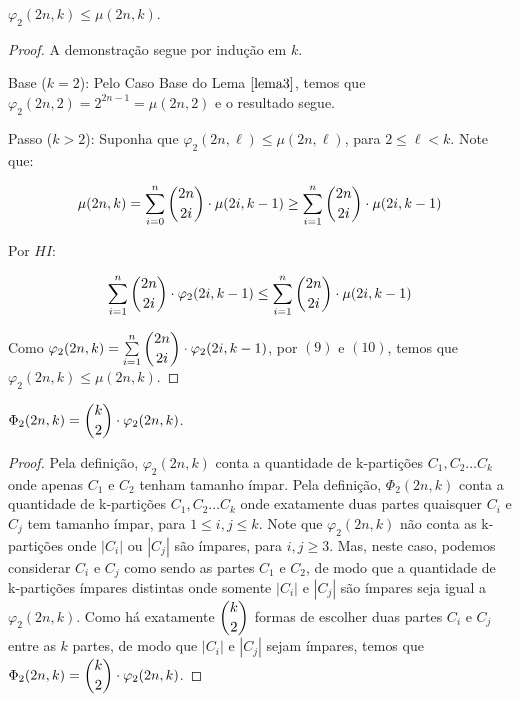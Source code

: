 \documentclass[12pt]{article}
\begin{document}
   \begin{lema}  
  	\label{lema4} 
  	$\varphi_2(2n, k) \leq \mu(2n, k)$.
  \end{lema}
  
  \begin{proof}
  	A demonstração segue por indução em $k$.
  	
  	Base ($k = 2$): Pelo Caso Base do Lema $\ref{lema3}$, temos que $\varphi_2(2n, 2) = 2^{2n - 1} = \mu(2n, 2)$ e o resultado segue. \newl
  	
  	Passo ($k > 2$): Suponha que $\varphi_2(2n, \ell) \leq \mu(2n, \ell)$, para $2 \leq \ell < k$. Note que: \newl
  	
  	\begin{align}
  		\begin{split}
  			\mu(2n, k) = \sum\limits_{i = 0}^{n} \escolhe{2n}{2i} \cdot \mu(2i, k-1)  \geq \sum\limits_{i = 1}^{n} \escolhe{2n}{2i} \cdot \mu(2i, k-1)
  		\end{split} 
  	\end{align}
  	
  	Por $HI$: \newl
  	
  	\begin{align}
  		\begin{split}
  			 \sum\limits_{i = 1}^{n} \escolhe{2n}{2i} \cdot \varphi_2(2i, k-1) \leq \sum\limits_{i = 1}^{n} \escolhe{2n}{2i} \cdot \mu(2i, k-1)
  		\end{split} 
  	\end{align}
  	
  	Como $\varphi_2(2n, k) = \sum\limits_{i = 1}^{n} \escolhe{2n}{2i} \cdot \varphi_2(2i, k-1)$, por $(9)$ e $(10)$, temos que $\varphi_2(2n, k) \leq \mu(2n, k)$.
  
  \end{proof} \newpage

  
  \begin{lema}  
  	\label{lema5} 
  	$\Phi_2(2n, k) = \escolhe{k}{2} \cdot \varphi_2(2n, k)$.
  \end{lema}
  
  \begin{proof}
  	Pela definição, $\varphi_2(2n, k)$ conta a quantidade de k-partições $C_1, C_2 \ldots C_k$ onde apenas $C_1$ e $C_2$ tenham tamanho ímpar. Pela definição, $\Phi_2(2n, k)$ conta a quantidade de k-partições $C_1, C_2 \ldots C_k$ onde exatamente duas partes quaisquer $C_i$ e $C_j$ tem tamanho ímpar, para $1 \leq i, j \leq k$. Note que $\varphi_2(2n, k)$ não conta as k-partições onde $|C_i|$ ou $|C_j|$ são ímpares, para $i, j \geq 3$. Mas, neste caso, podemos considerar $C_i$ e $C_j$ como sendo as partes $C_1$ e $C_2$, de modo que a quantidade de k-partições ímpares distintas onde somente $|C_i|$ e $|C_j|$ são ímpares seja igual a $\varphi_2(2n, k)$. Como há exatamente $\escolhe{k}{2}$ formas de escolher duas partes $C_i$ e $C_j$ entre as $k$ partes, de modo que $|C_i|$ e $|C_j|$ sejam ímpares, temos que $\Phi_2(2n, k) = \escolhe{k}{2} \cdot \varphi_2(2n, k)$.
  	
  \end{proof}\newl
  
\end{document}
